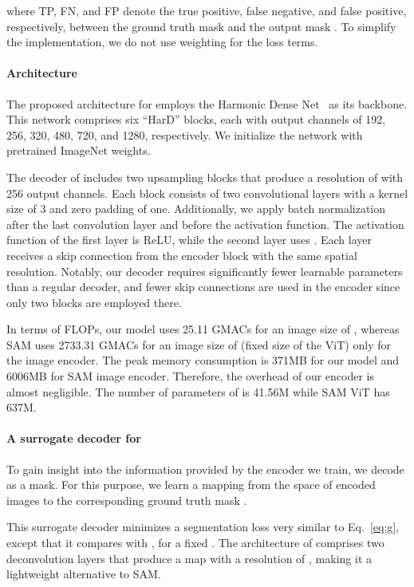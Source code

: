 \documentclass[runningheads]{llncs}
\begin{document}
where TP, FN, and FP denote the true positive, false negative, and false positive, respectively, between the ground truth mask  and the output mask .
To simplify the implementation, we do not use weighting for the loss terms.


\paragraph{Architecture}
The proposed architecture for  employs the Harmonic Dense Net~\cite{chao2019hardnet} as its backbone. This network comprises six ``HarD'' blocks, each with output channels of 192, 256, 320, 480, 720, and 1280, respectively. We initialize the network with pretrained ImageNet weights.

The decoder of  includes two upsampling blocks that produce a resolution of  with 256 output channels. Each block consists of two convolutional layers with a kernel size of 3 and zero padding of one. Additionally, we apply batch normalization after the last convolution layer and before the activation function. The activation function of the first layer is ReLU, while the second layer uses . Each layer receives a skip connection from the encoder block with the same spatial resolution. Notably, our decoder requires significantly fewer learnable parameters than a regular decoder, and fewer skip connections are used in the encoder since only two blocks are employed there.

{\color{black} In terms of FLOPs, our model uses 25.11 GMACs for an image size of , whereas SAM uses 2733.31 GMACs for an image size of  (fixed size of the ViT) only for the image encoder. The peak memory consumption is 371MB for our model and 6006MB for SAM image encoder. Therefore, the overhead of our encoder is almost negligible. The number of parameters of  is 41.56M while SAM ViT has 637M.}

\paragraph{A surrogate decoder for } To gain insight into the information provided by the encoder we train, we decode  as a mask. For this purpose, we learn a mapping  from the space of encoded images  to the corresponding ground truth mask . 

This surrogate decoder  minimizes a segmentation loss very similar to Eq.~\ref{eq:g}, except that it compares  with , for a fixed . The architecture of  comprises two deconvolution layers that produce a map with a resolution of , making it a lightweight alternative to SAM.
\end{document}

